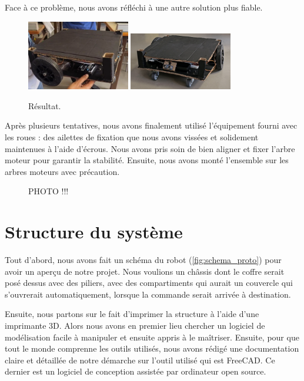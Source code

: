\documentclass[a4paper,12pt]{report}  %
\begin{document}
Face à ce problème, nous avons réfléchi à une autre solution plus fiable.

\begin{figure}[H]
	\centering
	\includegraphics[width=0.4\textwidth]{./attachments/proto-photo-1.png}
	\includegraphics[width=0.4\textwidth]{./attachments/proto-photo-2.png}
	\caption{Résultat.}
\end{figure}

Après plusieurs tentatives, nous avons finalement utilisé l’équipement fourni avec les roues : des ailettes de fixation que nous avons vissées et solidement maintenues à l’aide d’écrous. Nous avons pris soin de bien aligner et fixer l’arbre moteur pour garantir la stabilité. Ensuite, nous avons monté l’ensemble sur les arbres moteurs avec précaution.

\begin{figure}[H]
	\centering
	\caption{PHOTO !!!}
\end{figure}


\section{Structure du système}

Tout d’abord, nous avons fait un schéma du robot (\autoref{fig:schema_proto}) pour avoir un aperçu de notre projet. Nous voulions un châssis dont le coffre serait posé dessus avec des piliers, avec des compartiments qui aurait un couvercle qui s'ouvrerait automatiquement, lorsque la commande serait arrivée à destination. 

Ensuite, nous partons sur le fait d’imprimer la structure à l’aide d’une imprimante 3D. Alors nous avons en premier lieu chercher un logiciel de modélisation facile à manipuler et ensuite appris à le maîtriser. Ensuite, pour que tout le monde comprenne les outils utilisés, nous avons rédigé une documentation claire et détaillée de notre démarche sur l'outil utilisé qui est FreeCAD. Ce dernier est un logiciel de conception assistée par ordinateur open source.
\end{document}

